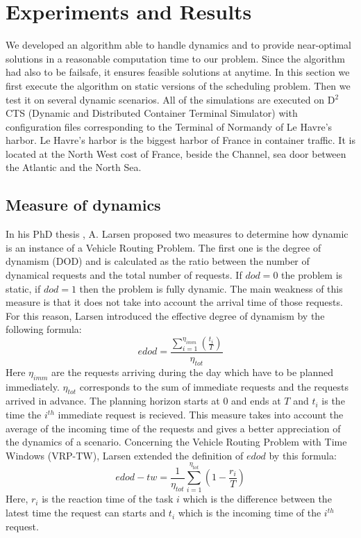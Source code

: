 \documentclass[review]{elsarticle}
\begin{document}
\section{Experiments and Results}\label{sec:expe}
   We developed an algorithm able to handle dynamics and to provide near-optimal solutions in a reasonable computation time to our problem. Since the algorithm had also to be failsafe, it ensures feasible solutions at anytime. In this section we first execute the algorithm on static versions of the scheduling problem. Then we test it on several dynamic scenarios.
   All of the simulations are executed on D$^2$CTS (Dynamic and Distributed Container Terminal Simulator)\cite{Lesauvage2011} with configuration files corresponding to the Terminal of Normandy of Le Havre's harbor. Le Havre’s harbor is the biggest harbor of France in container traffic. It is located at the North West cost of France, beside the Channel, sea door between the Atlantic and the North Sea.

	\subsection{Measure of dynamics}
In his PhD thesis \cite{Larsen00}, A. Larsen proposed two measures to determine how dynamic is an instance of a Vehicle Routing Problem. The first one is the degree of dynamism (DOD) and is calculated as the ratio between the number of dynamical requests and the total number of requests. If $dod=0$ the problem is static, if $dod=1$ then the problem is fully dynamic. The main weakness of this measure is that it does not take into account the arrival time of those requests. For this reason, Larsen introduced the effective degree of dynamism by the following formula: 
\begin{equation*}
 edod = \frac{\sum_{i=1}^{\eta_{imm}}\left(\frac{t_i}{T}\right)}{\eta_{tot}}
\end{equation*}
Here $\eta_{imm}$ are the requests arriving during the day which have to be planned immediately. $\eta_{tot}$ corresponds to the sum of immediate requests and the requests arrived in advance. The planning horizon starts at $0$ and ends at $T$ and $t_i$ is the time the $i^{th}$ immediate request is recieved. This measure takes into account the average of the incoming time of the requests and gives a better appreciation of the dynamics of a scenario.
Concerning the Vehicle Routing Problem with Time Windows (VRP-TW), Larsen extended the definition of $edod$ by this formula: 
\begin{equation*}
 edod-tw = \frac{1}{\eta_{tot}} \sum_{i=1}^{\eta_{tot}} \left(1 - \frac{r_i}{T}\right)
\end{equation*}
Here, $r_i$ is the reaction time of the task $i$ which is the difference between the latest time the request can starts and $t_i$ which is the incoming time of the $i^{th}$ request.\\
\end{document}
